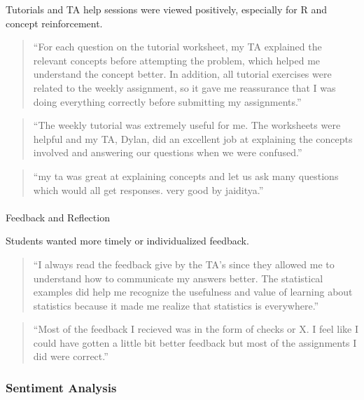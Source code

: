 \documentclass[
  letterpaper,
  DIV=11,
  numbers=noendperiod]{scrartcl}
\makeatletter
\let\oldparagraph\paragraph
\renewcommand{\paragraph}{
    \@ifstar
      \xxxParagraphStar
      \xxxParagraphNoStar
  }
\newcommand{\xxxParagraphStar}[1]{\oldparagraph*{#1}\mbox{}}
\newcommand{\xxxParagraphNoStar}[1]{\oldparagraph{#1}\mbox{}}
\makeatother
\begin{document}
Tutorials and TA help sessions were viewed positively, especially for R
and concept reinforcement.

\begin{quote}
``For each question on the tutorial worksheet, my TA explained the
relevant concepts before attempting the problem, which helped me
understand the concept better. In addition, all tutorial exercises were
related to the weekly assignment, so it gave me reassurance that I was
doing everything correctly before submitting my assignments.''
\end{quote}

\begin{quote}
``The weekly tutorial was extremely useful for me. The worksheets were
helpful and my TA, Dylan, did an excellent job at explaining the
concepts involved and answering our questions when we were confused.''
\end{quote}

\begin{quote}
``my ta was great at explaining concepts and let us ask many questions
which would all get responses. very good by jaiditya.''
\end{quote}

\paragraph{Feedback and Reflection}\label{feedback-and-reflection}

Students wanted more timely or individualized feedback.

\begin{quote}
``I always read the feedback give by the TA's since they allowed me to
understand how to communicate my answers better. The statistical
examples did help me recognize the usefulness and value of learning
about statistics because it made me realize that statistics is
everywhere.''
\end{quote}

\begin{quote}
``Most of the feedback I recieved was in the form of checks or X. I feel
like I could have gotten a little bit better feedback but most of the
assignments I did were correct.''
\end{quote}

\subsubsection{Sentiment Analysis}\label{sentiment-analysis}
\end{document}
